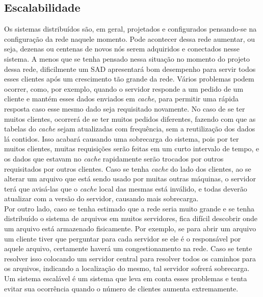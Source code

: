 	\subsection{Escalabilidade}
	Os sistemas distribuídos são, em geral, projetados e configurados pensando-se na configuração da rede naquele momento. 
	Pode acontecer dessa rede aumentar, ou seja, dezenas ou centenas de novos nós serem adquiridos e conectados nesse sistema. 
	A menos que se tenha pensado nessa situação no momento do projeto dessa rede, dificilmente um SAD apresentará bom desempenho para servir todos esses clientes após um crescimento tão grande da rede. 
	Vários problemas podem ocorrer, como, por exemplo, quando o servidor responde a um pedido de um cliente e mantém esses dados enviados em \textit{cache}, para permitir uma rápida resposta caso esse mesmo dado seja requisitado novamente. 
	No caso de se ter muitos clientes, ocorrerá de se ter muitos pedidos diferentes, fazendo com que as tabelas do \textit{cache} sejam atualizadas com frequência, sem a reutilização dos dados lá contidos. 
	Isso acabará causando uma sobrecarga do sistema, pois por ter muitos clientes, muitas requisições serão feitas em um curto intervalo de tempo, e os dados que estavam no \textit{cache} rapidamente serão trocados por outros requisitados por outros clientes. 
	Caso se tenha \textit{cache} do lado dos clientes, ao se alterar um arquivo que está sendo usado por muitas outras máquinas, o servidor terá que avisá-las que o \textit{cache} local das mesmas está inválido, e todas deverão atualizar com a versão do servidor, causando mais sobrecarga. 
	\\
	
	Por outro lado, caso se tenha estimado que a rede seria muito grande e se tenha distribuído o sistema de arquivos em muitos servidores, fica difícil descobrir onde um arquivo está armazenado fisicamente. 
	Por exemplo, se para abrir um arquivo um cliente tiver que perguntar para cada servidor se ele é o responsável por aquele arquivo, certamente haverá um congestionamento na rede. 
	Caso se tente resolver isso colocando um servidor central para resolver todos os caminhos para os arquivos, indicando a localização do mesmo, tal servidor sofrerá sobrecarga. 
	Um sistema escalável é um sistema que leva em conta esses problemas e tenta evitar sua ocorrência quando o número de clientes aumenta extremamente.
	
